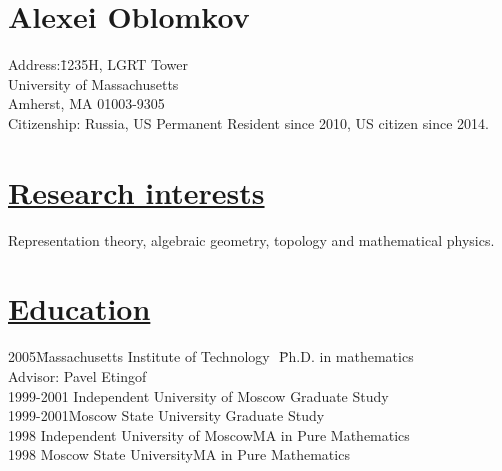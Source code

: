 \documentclass[11pt]{amsart}
\theoremstyle{plain}
\theoremstyle{definition}
\theoremstyle{remark}
\begin{document}
\section*{\bf{\huge Alexei Oblomkov}}
\bigskip



\begin{tabbing}
Address:\quad\quad\quad\;\= 1235H, LGRT Tower\\
                      \>University of Massachusetts\\
\>  Amherst, MA 01003-9305\\

Citizenship:\> Russia, US Permanent Resident since 2010, US citizen since 2014.
\end{tabbing}

\section*{\Large\underline{Research interests}}



\noindent Representation theory,  algebraic geometry, topology
and mathematical physics.




\section*{\Large\underline{Education}}
\begin{tabbing}
2005\quad\quad\quad\quad\quad\= Massachusetts Institute of
Technology   \quad\quad\,\,\:\:\:\:\= Ph.D. in
mathematics\\
\>\quad\quad  \>  Advisor: Pavel Etingof\\
1999-2001\> Independent University of
Moscow\> Graduate Study\\
1999-2001\>Moscow State University\> Graduate Study\\

1998\> Independent University of Moscow\>MA in Pure Mathematics\\
1998\> Moscow State University\>MA in Pure Mathematics
\end{tabbing}
\end{document}
